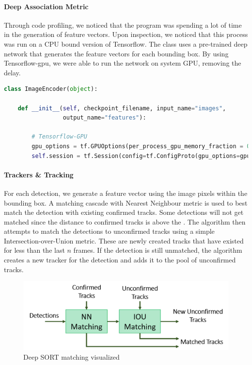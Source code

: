 \paragraph{Deep Association Metric} Through code profiling, we noticed that the program was spending a lot of time in the generation of feature vectors. Upon inspection, we noticed that this process was run on a CPU bound version of Tensorflow. The  class uses a pre-trained deep network that generates the feature vectors for each bounding box. By using Tensorflow-gpu, we were able to run the network on system GPU, removing the delay. \\

\begin{lstlisting}[language=Python, caption={Deep SORT Tensorflow GPU modifications}]
class ImageEncoder(object):

	def __init__(self, checkpoint_filename, input_name="images",
				 output_name="features"):
				 
        # Tensorflow-GPU
        gpu_options = tf.GPUOptions(per_process_gpu_memory_fraction = 0.2)
        self.session = tf.Session(config=tf.ConfigProto(gpu_options=gpu_options))
\end{lstlisting}


\paragraph{Trackers \& Tracking} For each detection, we generate a feature vector using the image pixels within the bounding box. A matching cascade with Nearest Neighbour metric is used to best match the detection with existing confirmed tracks. Some detections will not get matched since the distance to confirmed tracks is above the . The algorithm then attempts to match the detections to unconfirmed tracks using a simple Intersection-over-Union metric. These are newly created tracks that have existed for less than the last $n$ frames. If the detection is still unmatched, the algorithm creates a new tracker for the detection and adds it to the pool of unconfirmed tracks.

\begin{figure}[ht]
	\centering
	\includegraphics[width=0.8\linewidth]{img/chapter5_implementation/deepSortMatching.png}
	\caption{Deep SORT matching visualized}
	\label{fig:deepSortMatch}
\end{figure}

